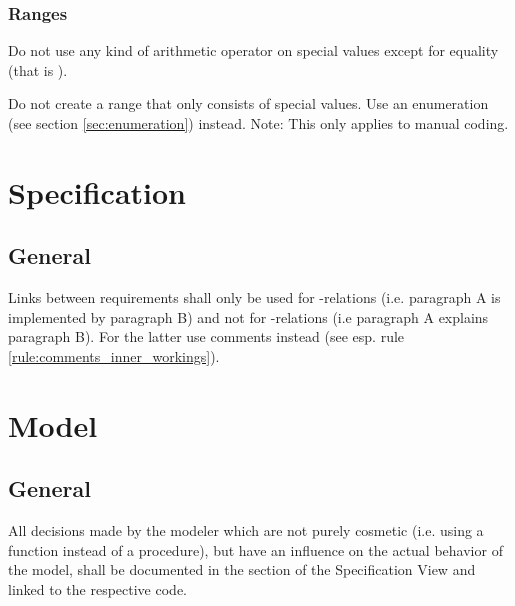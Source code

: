 \documentclass[draft]{efsguide}
\begin{document}
\subsection{Ranges}
\begin{rules}
\item Do not use any kind of arithmetic operator on special values except for equality (that is \code{==}). 
\item Do not create a range that only consists of special values. Use an enumeration (see section \ref{sec:enumeration}) instead. Note: This only applies to manual coding.
\end{rules}

\chapter{Specification}
\section{General}

\begin{rules}
\item Links between requirements shall only be used for -relations (i.e. paragraph A is implemented by paragraph B) and not for -relations (i.e paragraph A explains paragraph B). For the latter use comments instead (see esp. rule \ref{rule:comments_inner_workings}). 

\end{rules}



\chapter{Model}

\section{General}

\begin{rules}
\item \label{rule:model_general_design_choices} All decisions made by the modeler which are not purely cosmetic (i.e. using a function instead of a procedure), but have an influence on the actual behavior of the model, shall be documented in the section  of the Specification View and linked to the respective code. 

\end{rules}
\end{document}
